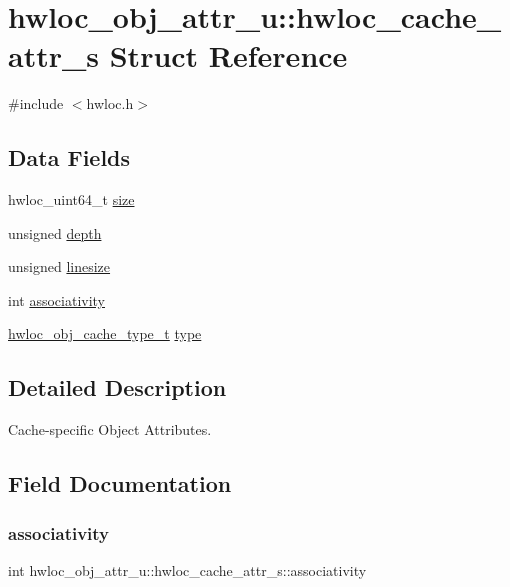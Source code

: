 \hypertarget{a00254}{}\section{hwloc\+\_\+obj\+\_\+attr\+\_\+u\+:\+:hwloc\+\_\+cache\+\_\+attr\+\_\+s Struct Reference}
\label{a00254}


{\ttfamily \#include $<$hwloc.\+h$>$}

\subsection*{Data Fields}
\begin{DoxyCompactItemize}
\item 
hwloc\+\_\+uint64\+\_\+t \hyperlink{a00254_abe5e788943ed04302976740c829674c0}{size}
\item 
unsigned \hyperlink{a00254_a5c8f7f39193736c2187ed626940835d5}{depth}
\item 
unsigned \hyperlink{a00254_a801e8a668e28caf06c8b88e9ae5c10db}{linesize}
\item 
int \hyperlink{a00254_ad06525e474d1e2d1423ed71bb998592d}{associativity}
\item 
\hyperlink{a00184_gab6e1e7efedae8b341f3ee14fbe53d66c}{hwloc\+\_\+obj\+\_\+cache\+\_\+type\+\_\+t} \hyperlink{a00254_ad8edc8ded2b7a70d6abbc874801930f4}{type}
\end{DoxyCompactItemize}


\subsection{Detailed Description}
Cache-\/specific Object Attributes. 

\subsection{Field Documentation}
\mbox{\label{a00254_ad06525e474d1e2d1423ed71bb998592d}} 
\subsubsection{\texorpdfstring{associativity}{associativity}}
{\footnotesize\ttfamily int hwloc\+\_\+obj\+\_\+attr\+\_\+u\+::hwloc\+\_\+cache\+\_\+attr\+\_\+s\+::associativity}



